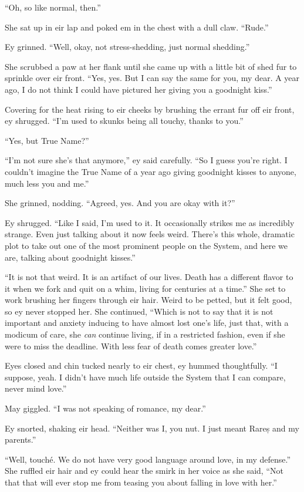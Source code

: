 ``Oh, so like normal, then.''

She sat up in eir lap and poked em in the chest with a dull claw. ``Rude.''

Ey grinned. ``Well, okay, not stress-shedding, just normal shedding.''

She scrubbed a paw at her flank until she came up with a little bit of shed fur to sprinkle over eir front. ``Yes, yes. But I can say the same for you, my dear. A year ago, I do not think I could have pictured her giving you a goodnight kiss.''

Covering for the heat rising to eir cheeks by brushing the errant fur off eir front, ey shrugged. ``I'm used to skunks being all touchy, thanks to you.''

``Yes, but True Name?''

``I'm not sure she's that anymore,'' ey said carefully. ``So I guess you're right. I couldn't imagine the True Name of a year ago giving goodnight kisses to anyone, much less you and me.''

She grinned, nodding. ``Agreed, yes. And you are okay with it?''

Ey shrugged. ``Like I said, I'm used to it. It occasionally strikes me as incredibly strange. Even just talking about it now feels weird. There's this whole, dramatic plot to take out one of the most prominent people on the System, and here we are, talking about goodnight kisses.''

``It is not that weird. It is an artifact of our lives. Death has a different flavor to it when we fork and quit on a whim, living for centuries at a time.'' She set to work brushing her fingers through eir hair. Weird to be petted, but it felt good, so ey never stopped her. She continued, ``Which is not to say that it is not important and anxiety inducing to have almost lost one's life, just that, with a modicum of care, she \emph{can} continue living, if in a restricted fashion, even if she were to miss the deadline. With less fear of death comes greater love.''

Eyes closed and chin tucked nearly to eir chest, ey hummed thoughtfully. ``I suppose, yeah. I didn't have much life outside the System that I can compare, never mind love.''

May giggled. ``I was not speaking of romance, my dear.''

Ey snorted, shaking eir head. ``Neither was I, you nut. I just meant Rareș and my parents.''

``Well, touché. We do not have very good language around love, in my defense.'' She ruffled eir hair and ey could hear the smirk in her voice as she said, ``Not that that will ever stop me from teasing you about falling in love with her.''


